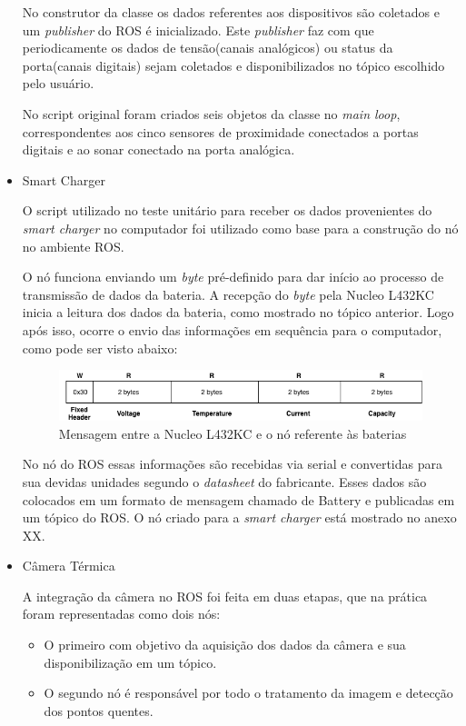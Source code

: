 \begin{itemize}
No construtor da classe os dados referentes aos dispositivos são coletados e um \textit{publisher} do ROS é inicializado. Este  \textit{publisher} faz com que periodicamente os dados de tensão(canais analógicos) ou status da porta(canais digitais) sejam coletados e disponibilizados no tópico escolhido pelo usuário. 

No script original foram criados seis objetos da classe no \textit{main loop}, correspondentes aos cinco sensores de proximidade conectados a portas digitais e ao sonar conectado na porta analógica.

\item Smart Charger

O script utilizado no teste unitário para receber os dados provenientes do \textit{smart charger} no computador foi utilizado como base para a construção do nó no ambiente ROS.

O nó funciona enviando um \textit{byte} pré-definido para dar início ao processo de transmissão de dados da bateria. A recepção do \textit{byte} pela Nucleo L432KC inicia a leitura dos dados da bateria, como mostrado no tópico anterior. Logo após isso, ocorre o envio das informações em sequência para o computador, como pode ser visto abaixo:

\begin{figure}[!ht]
	\centering
	\includegraphics[width=16cm]{Figures/batt_protocol_2.png}
	\caption{Mensagem entre a Nucleo L432KC e o nó referente às baterias}
	\label{fig:battprotocol2}
\end{figure}

No nó do ROS essas informações são recebidas via serial e convertidas para sua devidas unidades segundo o \textit{datasheet} do fabricante. Esses dados são colocados em um formato de mensagem chamado de Battery e publicadas em um tópico do ROS. O nó criado para a \textit{smart charger} está mostrado no anexo XX.

\item Câmera Térmica

A integração da câmera no ROS foi feita em duas etapas, que na prática foram representadas como dois nós:

\begin{itemize}
\item O primeiro com objetivo da aquisição dos dados da câmera e sua disponibilização em um tópico.
	\item O segundo nó é responsável por todo o tratamento da imagem e detecção dos pontos quentes.
\end{itemize}


\end{itemize}

